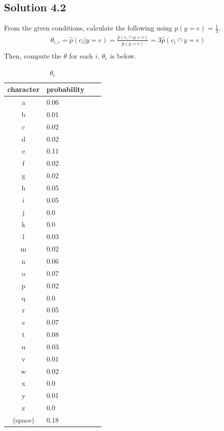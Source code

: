 \documentclass[a4paper]{article}
\theoremstyle{definition}
\newenvironment{soln}{
	\leavevmode\color{blue}\ignorespaces
}{}
\begin{document}
	\subsection*{Solution 4.2}		
	\begin{soln}
	From the given conditions, calculate the following using $p(y = e) = \frac{1}{3}$.
		\begin{equation*}\label{xx}
			\begin{split}
				\theta_{i,e} = \hat{p}(c_i | y = e) = \frac{\hat{p}(c_i \cap y=e )}{\hat{p}(y=e)} = 3 \hat{p}(c_i \cap y=e ) \\
			\end{split}
		\end{equation*}		
	Then, compute the $\theta$ for each $i$. $\theta_e$ is below.
\begin{table}[ht]
 \caption{$\theta_e$}
 \centering
  \begin{tabular}{clll}
   \hline
   character & probability \\
   \hline \hline
a & 0.06 \\
b & 0.01 \\
c & 0.02 \\
d & 0.02 \\
e & 0.11 \\
f & 0.02 \\
g & 0.02 \\
h & 0.05 \\
i & 0.05 \\
j & 0.0 \\
k & 0.0 \\
l & 0.03 \\
m & 0.02 \\
n & 0.06 \\
o & 0.07 \\
p & 0.02 \\
q & 0.0 \\
r & 0.05 \\
s & 0.07 \\
t & 0.08 \\
u & 0.03 \\
v & 0.01 \\
w & 0.02 \\
x & 0.0 \\
y & 0.01 \\
z & 0.0 \\
(space)  & 0.18 \\
   \hline
  \end{tabular}
\end{table}
	\end{soln}	
\end{document}
